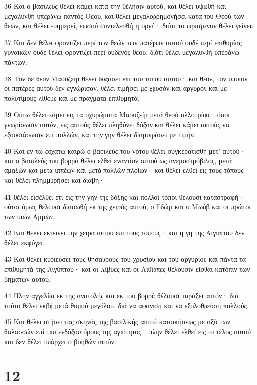 \par 36 Και ο βασιλεύς θέλει κάμει κατά την θέλησιν αυτού, και θέλει υψωθή και μεγαλυνθή υπεράνω παντός Θεού, και θέλει μεγαλορρημονήσει κατά του Θεού των θεών, και θέλει ευημερεί, εωσού συντελεσθή η οργή· διότι το ωρισμένον θέλει γείνει.
\par 37 Και δεν θέλει φροντίζει περί των θεών των πατέρων αυτού ουδέ περί επιθυμίας γυναικών ουδέ θέλει φροντίζει περί ουδενός θεού, διότι θέλει μεγαλυνθή υπεράνω πάντων.
\par 38 Τον δε θεόν Μαουζείμ θέλει δοξάσει επί του τόπου αυτού· και θεόν, τον οποίον οι πατέρες αυτού δεν εγνώρισαν, θέλει τιμήσει με χρυσόν και άργυρον και με πολυτίμους λίθους και με πράγματα επιθυμητά.
\par 39 Ούτω θέλει κάμει εις τα οχυρώματα Μαουζείμ μετά θεού αλλοτρίου· όσοι γνωρίσωσιν αυτόν, εις αυτούς θέλει πληθύνει δόξαν και θέλει κάμει αυτούς να εξουσιάσωσιν επί πολλών, και την γην θέλει διαμοιράσει με τιμήν.
\par 40 Και εν τω εσχάτω καιρώ ο βασιλεύς του νότου θέλει συγκερατισθή μετ' αυτού· και ο βασιλεύς του βορρά θέλει ελθεί εναντίον αυτού ως ανεμοστρόβιλος, μετά αμαξών και μετά ιππέων και μετά πολλών πλοίων· και θέλει ελθεί εις τους τόπους και θέλει πλημμυρήσει και διαβή·
\par 41 θέλει εισέλθει έτι εις την γην της δόξης και πολλοί τόποι θέλουσι καταστραφή· ούτοι όμως θέλουσι διασωθή εκ της χειρός αυτού, ο Εδώμ και ο Μωάβ και οι πρώτοι των υιών Αμμών.
\par 42 Και θέλει εκτείνει την χείρα αυτού επί τους τόπους· και η γη της Αιγύπτου δεν θέλει εκφύγει.
\par 43 Και θέλει κυριεύσει τους θησαυρούς του χρυσίου και του αργυρίου και πάντα τα επιθυμητά της Αιγύπτου· και οι Λίβυες και οι Αιθίοπες θέλουσιν είσθαι κατόπιν των βημάτων αυτού.
\par 44 Πλην αγγελίαι εκ της ανατολής και εκ του βορρά θέλουσι ταράξει αυτόν· διά τούτο θέλει εκβή μετά θυμού μεγάλου, διά να αφανίση και να εξολοθρεύση πολλούς.
\par 45 Και θέλει στήσει τας σκηνάς της βασιλικής αυτού κατοικήσεως μεταξύ των θαλασσών επί του ενδόξου όρους της αγιότητος· πλην θέλει ελθεί εις το τέλος αυτού και δεν θέλει υπάρχει ο βοηθών αυτόν.

\chapter{12}

